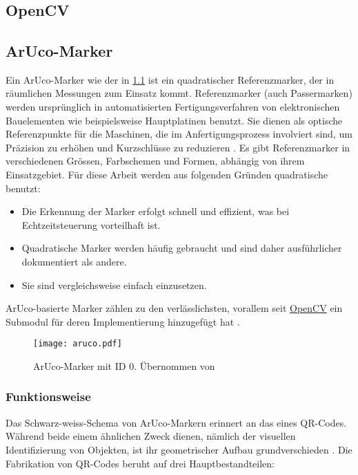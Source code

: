 \chapter{\chapTwo}
\label{sec:kapitel2} %

\begingroup
\fontsize{12pt}{14pt}\selectfont

\section{OpenCV}
\label{sec:opencv} %
\blindtext

\section{ArUco-Marker}
Ein ArUco-Marker wie der in \ref{fig:marker0} ist ein quadratischer Referenzmarker, der in räumlichen Messungen zum Einsatz kommt. Referenzmarker (auch Passermarken) werden ursprünglich in automatisierten Fertigungsverfahren von elektronischen Bauelementen wie beispielsweise Hauptplatinen benutzt. Sie dienen als optische Referenzpunkte für die Maschinen, die im Anfertigungsprozess involviert sind, um Präzision zu erhöhen und Kurzschlüsse zu reduzieren \cite{Wiki:Passermarke}. 
Es gibt Referenzmarker in verschiedenen Grössen, Farbschemen und Formen, abhängig von ihrem Einsatzgebiet. Für diese Arbeit werden aus folgenden Gründen quadratische benutzt:

\begin{itemize}
  \item Die Erkennung der Marker erfolgt schnell und effizient, was bei Echtzeitsteuerung vorteilhaft ist.
  \item Quadratische Marker werden häufig gebraucht und sind daher ausführlicher dokumentiert als andere.
  \item Sie sind vergleichsweise einfach einzusetzen.
\end{itemize}

ArUco-basierte Marker zählen zu den verlässlichsten, vorallem seit \hyperref[sec:opencv]{OpenCV} ein Submodul für deren Implementierung hinzugefügt hat \cite{IJ:fiducial}.

\begin{figure}[H]
    \centering
        \texttt{[image: aruco.pdf]}
    \caption{ArUco-Marker mit ID 0. Übernommen von \cite{chev:arucogen}}
        \label{fig:marker0}
\end{figure}

\subsection{Funktionsweise}
Das Schwarz-weiss-Schema von ArUco-Markern erinnert an das eines QR-Codes. Während beide einem ähnlichen Zweck dienen, nämlich der visuellen Identifizierung von Objekten, ist ihr geometrischer Aufbau grundverschieden \cite{ten:qrcode}.
Die Fabrikation von QR-Codes beruht auf drei Hauptbestandteilen:

